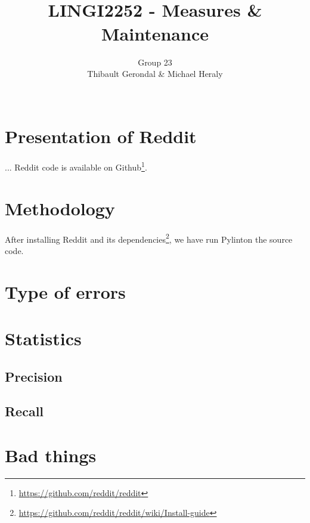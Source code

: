 \documentclass[11pt, a4paper]{article}
\title{\tbf{UCL} \\
	LINGI2252 - Measures \& Maintenance}
\author{Group 23 \\
		Thibault Gerondal \& Michael Heraly \\
		\\
		\tit{Teacher: Kim Mens}}
\newcommand{\pyl}{\textsf{Pylint}}
\begin{document}
\maketitle


\section*{Presentation of Reddit}

...
Reddit code is available on Github\footnote{\url{https://github.com/reddit/reddit}}.


\section{Methodology}

After installing Reddit and its dependencies\footnote{\url{https://github.com/reddit/reddit/wiki/Install-guide}}, we have run \pyl on the source code.


\section{Type of errors}


\section{Statistics}

\subsection*{Precision}


\subsection*{Recall}


\section{Bad things}
\end{document}
